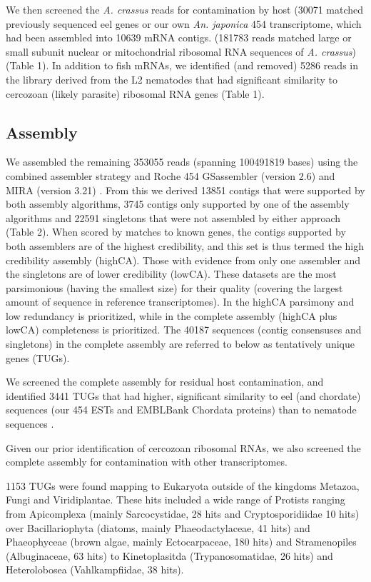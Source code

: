 \documentclass[10pt]{bmc_article}
\newenvironment{bmcformat}{\begin{raggedright}\baselineskip20pt\sloppy\setboolean{publ}{false}}{\end{raggedright}\baselineskip20pt\sloppy}
\begin{document}
\begin{bmcformat}
We then screened the \textit{A. crassus} reads for contamination by
host (30071 matched previously
sequenced eel genes or our own \textit{An. japonica} 454
transcriptome, which had been assembled into
10639 mRNA
contigs. (181783 reads matched large or
small subunit nuclear or mitochondrial ribosomal RNA sequences of
\textit{A. crassus}) (Table 1). In addition to fish mRNAs, we
identified (and removed) 5286
reads in the library derived from the L2 nematodes that had
significant similarity to cercozoan (likely parasite) ribosomal RNA
genes (Table 1).

\subsection*{Assembly}


We assembled the remaining 353055 reads (spanning
100491819 bases) using the combined assembler strategy
\cite{pmid20950480} and Roche 454 GSassembler (version 2.6) and MIRA
(version 3.21) \cite{miraEST}. From this we derived 13851
contigs that were supported by both assembly algorithms,
3745 contigs only supported by one of the assembly
algorithms and 22591 singletons that were not assembled by
either approach (Table 2). When scored by matches to known genes, the
contigs supported by both assemblers are of the highest credibility,
and this set is thus termed the high credibility assembly
(highCA). Those with evidence from only one assembler and the
singletons are of lower credibility (lowCA). These datasets are the
most parsimonious (having the smallest size) for their quality
(covering the largest amount of sequence in reference
transcriptomes). In the highCA parsimony and low redundancy is
prioritized, while in the complete assembly (highCA plus lowCA)
completeness is prioritized. The 40187 sequences (contig consensuses
and singletons) in the complete assembly are referred to below as
tentatively unique genes (TUGs).




We screened the complete assembly for residual host contamination, and
identified 3441 TUGs that had higher, significant similarity to
eel (and chordate) sequences (our 454 ESTs and EMBLBank Chordata
proteins) than to nematode sequences \cite{pmid21550347}.

Given our prior identification of cercozoan ribosomal RNAs, we also
screened the complete assembly for contamination with other
transcriptomes.

1153 TUGs were found mapping to Eukaryota outside of the kingdoms
Metazoa, Fungi and Viridiplantae. These hits included a wide range of
Protists ranging from Apicomplexa (mainly Sarcocystidae, 28 hits and
Cryptosporidiidae 10 hits) over Bacillariophyta (diatoms, mainly
Phaeodactylaceae, 41 hits) and Phaeophyceae (brown algae, mainly
Ectocarpaceae, 180 hits) and Stramenopiles (Albuginaceae, 63 hits) to
Kinetoplasitda (Trypanosomatidae, 26 hits) and Heterolobosea
(Vahlkampfiidae, 38 hits).


\end{bmcformat}
\end{document}
